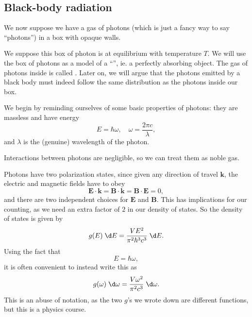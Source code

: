 \documentclass[a4paper]{article}
\begin{document}
\subsection{Black-body radiation}
We now suppose we have a gas of photons (which is just a fancy way to say ``photons'') in a box with opaque walls.
\begin{center}
\end{center}
We suppose this box of photon is at equilibrium with temperature $T$. We will use the box of photons as a model of a ``'', ie. a perfectly absorbing object. The gas of photons inside is called .
 Later on, we will argue that the photons emitted by a black body must indeed follow the same distribution as the photons inside our box.

We begin by reminding ourselves of some basic properties of photons: they are massless and have energy
\[
  E = \hbar \omega,\quad \omega = \frac{2\pi c}{\lambda},
\]
and $\lambda$ is the (genuine) wavelength of the photon.

Interactions between photons are negligible, so we can treat them as noble gas.

Photons have two polarization states, since given any direction of travel $\mathbf{k}$, the electric and magnetic fields have to obey
\[
  \mathbf{E} \cdot \mathbf{k} = \mathbf{B} \cdot \mathbf{k} = \mathbf{B} \cdot \mathbf{E} = 0,
\]
and there are two independent choices for $\mathbf{E}$ and $\mathbf{B}$. This has implications for our counting, as we need an extra factor of $2$ in our density of states. So the density of states is given by
\[
  g(E) \;\d E = \frac{VE^2}{\pi^2 \hbar^3 c^3}\;\d E.
\]
Using the fact that
\[
  E = \hbar \omega,
\]
it is often convenient to instead write this as
\[
  g(\omega)\; \d \omega = \frac{V \omega^2}{\pi^2 c^3}\;\d \omega.
\]
This is an abuse of notation, as the two $g$'s we wrote down are different functions, but this is a physics course.
\end{document}
